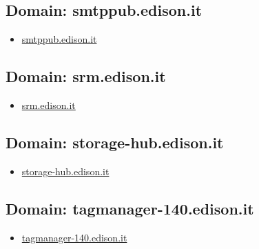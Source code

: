 \documentclass{article}
\begin{document}
    \subsection{Domain: smtppub.edison.it}
    \begin{itemize}
        
            
                
                \item \href{ http://smtppub.edison.it/}{ smtppub.edison.it }
            
        
    \end{itemize}

    \subsection{Domain: srm.edison.it}
    \begin{itemize}
        
            
                
                \item \href{ http://srm.edison.it/}{ srm.edison.it }
            
        
    \end{itemize}

    \subsection{Domain: storage-hub.edison.it}
    \begin{itemize}
        
            
                
                \item \href{ http://storage-hub.edison.it/}{ storage-hub.edison.it }
            
        
    \end{itemize}

    \subsection{Domain: tagmanager-140.edison.it}
    \begin{itemize}
        
            
                
                \item \href{ http://tagmanager-140.edison.it/}{ tagmanager-140.edison.it }
            
        
    \end{itemize}
\end{document}

